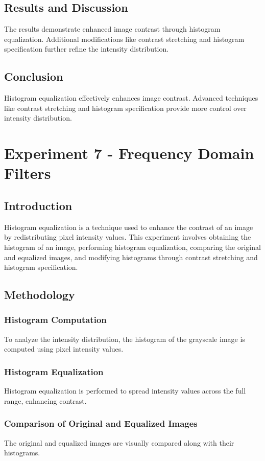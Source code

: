 \documentclass{report}
\begin{document}
\section{Results and Discussion}
The results demonstrate enhanced image contrast through histogram equalization. Additional modifications like contrast stretching and histogram specification further refine the intensity distribution.

\section{Conclusion}
Histogram equalization effectively enhances image contrast. Advanced techniques like contrast stretching and histogram specification provide more control over intensity distribution.

\chapter{Experiment 7 - Frequency Domain Filters}

\section{Introduction}
Histogram equalization is a technique used to enhance the contrast of an image by redistributing pixel intensity values. This experiment involves obtaining the histogram of an image, performing histogram equalization, comparing the original and equalized images, and modifying histograms through contrast stretching and histogram specification.

\section{Methodology}

\subsection{Histogram Computation}
To analyze the intensity distribution, the histogram of the grayscale image is computed using pixel intensity values.

\subsection{Histogram Equalization}
Histogram equalization is performed to spread intensity values across the full range, enhancing contrast.

\subsection{Comparison of Original and Equalized Images}
The original and equalized images are visually compared along with their histograms.
\end{document}
